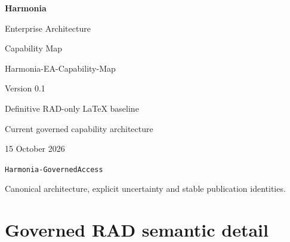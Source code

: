 \documentclass[10pt,a4paper,oneside,headings=small]{scrreprt}
\begin{document}
\hypersetup{pageanchor=false}
\begin{titlepage}
\vspace*{24mm}
{\Huge\bfseries\color{Ink} Harmonia\par}
\vspace{8mm}
{\LARGE Enterprise Architecture\par Capability Map\par}
\vspace{12mm}
{\Large Harmonia-EA-Capability-Map\par Version 0.1\par}
\vspace{12mm}
{\large Definitive RAD-only LaTeX baseline\par}
\vfill
Current governed capability architecture\par
15 October 2026\par
\texttt{Harmonia-GovernedAccess}\par
\vspace{8mm}
Canonical architecture, explicit uncertainty and stable publication identities.
\end{titlepage}
\hypersetup{pageanchor=true}
\tableofcontents
\clearpage
{}







\part{Governed RAD semantic detail}

\clearpage
{}
{}
\renewcommand{\indexname}{Index of architectural names}
\printindex
\end{document}
